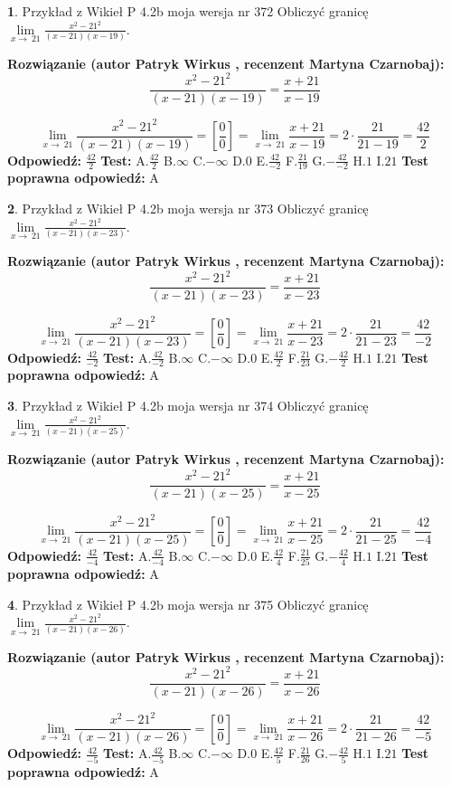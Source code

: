 \documentclass[12pt, a4paper]{article}
\theoremstyle{definition} %
\newtheorem{zad}{}
\newcommand{\zadStart}[1]{\begin{zad}#1\newline}
\newcommand{\zadStop}{\end{zad}}
\newcommand{\rozwStart}[2]{\noindent \textbf{Rozwiązanie (autor #1 , recenzent #2): }\newline}
\newcommand{\rozwStop}{\newline}
\newcommand{\odpStart}{\noindent \textbf{Odpowiedź:}\newline}
\newcommand{\odpStop}{\newline}
\newcommand{\testStart}{\noindent \textbf{Test:}\newline}
\newcommand{\testStop}{\newline}
\newcommand{\kluczStart}{\noindent \textbf{Test poprawna odpowiedź:}\newline}
\newcommand{\kluczStop}{\newline}
\begin{document}
\zadStart{Przykład z Wikieł P 4.2b moja wersja nr 372}
Obliczyć granicę $\lim\limits_{x\to\ 21}\frac{x^{2}-21^{2}}{(x-21)(x-19)}$.
\zadStop
\rozwStart{Patryk Wirkus}{Martyna Czarnobaj}
$$\frac{x^{2}-21^{2}}{(x-21)(x-19)}=\frac{x+21}{x-19}$$

$$\lim\limits_{x\to\ 21}\frac{x^{2}-21^{2}}{(x-21)(x-19)}=[\frac{0}{0}]=\lim\limits_{x\to\ 21}\frac{x+21}{x-19}=2 \cdot \frac{21}{21-19} = \frac{42}{2}$$
\rozwStop
\odpStart
$\frac{42}{2}$
\odpStop
\testStart
A.$\frac{42}{2}$
B.$\infty$
C.$-\infty$
D.$0$
E.$\frac{42}{-2}$
F.$\frac{21}{19}$
G.$-\frac{42}{-2}$
H.$1$
I.$21$
\testStop
\kluczStart
A
\kluczStop



\zadStart{Przykład z Wikieł P 4.2b moja wersja nr 373}
Obliczyć granicę $\lim\limits_{x\to\ 21}\frac{x^{2}-21^{2}}{(x-21)(x-23)}$.
\zadStop
\rozwStart{Patryk Wirkus}{Martyna Czarnobaj}
$$\frac{x^{2}-21^{2}}{(x-21)(x-23)}=\frac{x+21}{x-23}$$

$$\lim\limits_{x\to\ 21}\frac{x^{2}-21^{2}}{(x-21)(x-23)}=[\frac{0}{0}]=\lim\limits_{x\to\ 21}\frac{x+21}{x-23}=2 \cdot \frac{21}{21-23} = \frac{42}{-2}$$
\rozwStop
\odpStart
$\frac{42}{-2}$
\odpStop
\testStart
A.$\frac{42}{-2}$
B.$\infty$
C.$-\infty$
D.$0$
E.$\frac{42}{2}$
F.$\frac{21}{23}$
G.$-\frac{42}{2}$
H.$1$
I.$21$
\testStop
\kluczStart
A
\kluczStop



\zadStart{Przykład z Wikieł P 4.2b moja wersja nr 374}
Obliczyć granicę $\lim\limits_{x\to\ 21}\frac{x^{2}-21^{2}}{(x-21)(x-25)}$.
\zadStop
\rozwStart{Patryk Wirkus}{Martyna Czarnobaj}
$$\frac{x^{2}-21^{2}}{(x-21)(x-25)}=\frac{x+21}{x-25}$$

$$\lim\limits_{x\to\ 21}\frac{x^{2}-21^{2}}{(x-21)(x-25)}=[\frac{0}{0}]=\lim\limits_{x\to\ 21}\frac{x+21}{x-25}=2 \cdot \frac{21}{21-25} = \frac{42}{-4}$$
\rozwStop
\odpStart
$\frac{42}{-4}$
\odpStop
\testStart
A.$\frac{42}{-4}$
B.$\infty$
C.$-\infty$
D.$0$
E.$\frac{42}{4}$
F.$\frac{21}{25}$
G.$-\frac{42}{4}$
H.$1$
I.$21$
\testStop
\kluczStart
A
\kluczStop



\zadStart{Przykład z Wikieł P 4.2b moja wersja nr 375}
Obliczyć granicę $\lim\limits_{x\to\ 21}\frac{x^{2}-21^{2}}{(x-21)(x-26)}$.
\zadStop
\rozwStart{Patryk Wirkus}{Martyna Czarnobaj}
$$\frac{x^{2}-21^{2}}{(x-21)(x-26)}=\frac{x+21}{x-26}$$

$$\lim\limits_{x\to\ 21}\frac{x^{2}-21^{2}}{(x-21)(x-26)}=[\frac{0}{0}]=\lim\limits_{x\to\ 21}\frac{x+21}{x-26}=2 \cdot \frac{21}{21-26} = \frac{42}{-5}$$
\rozwStop
\odpStart
$\frac{42}{-5}$
\odpStop
\testStart
A.$\frac{42}{-5}$
B.$\infty$
C.$-\infty$
D.$0$
E.$\frac{42}{5}$
F.$\frac{21}{26}$
G.$-\frac{42}{5}$
H.$1$
I.$21$
\testStop
\kluczStart
A
\kluczStop
\end{document}

